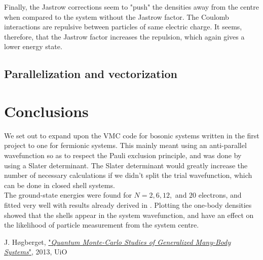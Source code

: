 \documentclass[english, a4paper]{article}
\begin{document}
	Finally, the Jastrow corrections seem to "push" the densities away from the centre when compared to the system without the Jastrow factor. The Coulomb interactions are repulsive between particles of same electric charge. It seems, therefore, that the Jastrow factor increases the repulsion, which again gives a lower energy state.
	
	\subsection{Parallelization and vectorization}
	
	
	\section{Conclusions}
	We set out to expand upon the VMC code for bosonic systems written in the first project to one for fermionic systems. This mainly meant using an anti-parallel wavefunction so as to respect the Pauli exclusion principle, and was done by using a Slater determinant. The Slater determinant would greatly increase the number of necessary calculations if we didn't split the trial wavefunction, which can be done in closed shell systems.\\
	The ground-state energies were found for $N=2,6,12,$ and $20$ electrons, and fitted very well with results already derived in \cite{H_Msc}. Plotting the one-body densities showed that the shells appear in the system wavefunction, and have an effect on the likelihood of particle measurement from the system centre.
	
	
	\begin{thebibliography}{9}
		J. Høgberget, \href{https://www.duo.uio.no/handle/10852/37167}{"\emph{Quantum Monte-Carlo Studies of Generalized Many-Body Systems}"}, 2013, UiO
	\end{thebibliography}
	
\end{document}
